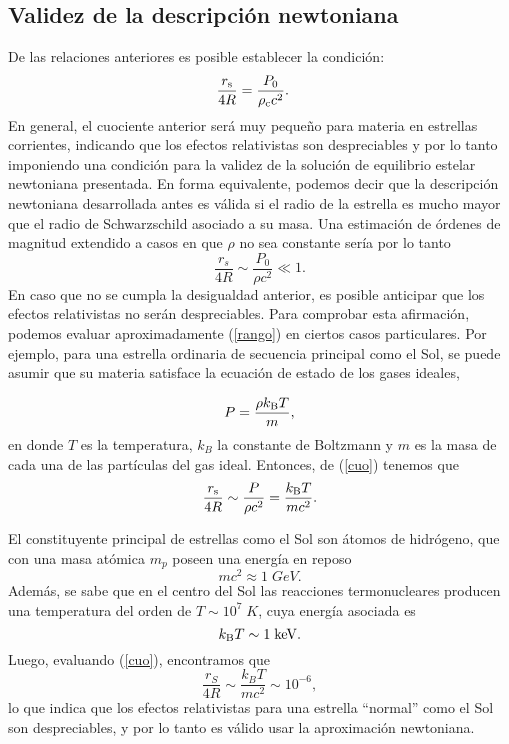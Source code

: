 \subsection{Validez de la descripción newtoniana}

De las relaciones anteriores es posible establecer la condición:
\begin{align}
\frac{r_{\rm s}}{4R}&=\frac{P_0}{\rho_{\rm c} c^2}. \label{rango}
\end{align}
En general, el cuociente anterior será muy peque\~no para materia en estrellas corrientes, indicando que los efectos relativistas son despreciables y por lo tanto imponiendo una condición para la validez de la solución de equilibrio estelar newtoniana presentada. En forma equivalente, podemos decir que la descripción newtoniana desarrollada antes es válida si el radio de la estrella es mucho mayor que el radio de Schwarzschild asociado a su masa. Una estimación de órdenes de magnitud extendido a casos en que $\rho$ no sea constante sería por lo tanto
\begin{equation}\label{cuo}
\frac{r_s}{4R}\sim\frac{P_0}{\rho c^2}\ll 1.
\end{equation}
En caso que no se cumpla la desigualdad anterior, es posible anticipar que los efectos relativistas no serán despreciables. Para comprobar esta afirmación, podemos evaluar aproximadamente (\ref{rango})  en ciertos casos particulares. Por ejemplo, para una estrella ordinaria de secuencia principal como el Sol, se puede asumir que su materia satisface la ecuación de estado de los gases ideales,

\begin{equation}
P=\frac{\rho k_{\rm B} T}{m},
\end{equation}
en donde $T$ es la temperatura, $k_B$ la constante de Boltzmann y $m$ es la masa de cada una de las partículas del gas ideal. Entonces, de (\ref{cuo}) tenemos que
\begin{equation}
\frac{r_{\rm s}}{4R}\sim\frac{P}{\rho c^2}=\frac{k_{\rm B}T}{mc^2}.
\end{equation}

El constituyente principal de estrellas como el Sol son átomos de hidrógeno, que con una masa atómica $m_p$ poseen una energía en reposo
\begin{equation}
mc^2\approx1\;GeV.
\end{equation}
Además, se sabe que en el centro del Sol las reacciones termonucleares producen una temperatura del orden de $T\sim 10^7\; K$, cuya energía asociada es
\begin{equation}\label{17}
k_{\rm B}T\sim 1\; {\rm keV}.
\end{equation}
Luego, evaluando (\ref{cuo}), encontramos que
\begin{equation}\label{18}
\frac{r_S}{4R}\sim\frac{k_{B}T}{mc^2}\sim10^{-6},
\end{equation}
lo que indica que los efectos relativistas para una estrella ``normal'' como el Sol son despreciables, y por lo tanto es válido usar la aproximación newtoniana.

